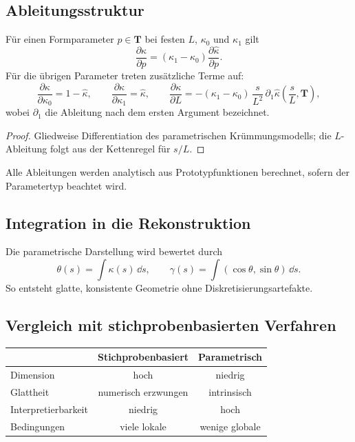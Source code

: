 \subsection{Ableitungsstruktur}
\begin{proposition}[Ableitungsstruktur]
\label{prop:parametric-derivative-structure}
Für einen Formparameter \(p\in\mathbf T\) bei festen \(L\), \(\kappa_0\)
und \(\kappa_1\) gilt
\[
\frac{\partial\kappa}{\partial p}
=(\kappa_1-\kappa_0)\frac{\partial\widehat\kappa}{\partial p}.
\]
Für die übrigen Parameter treten zusätzliche Terme auf:
\[
\frac{\partial\kappa}{\partial\kappa_0}=1-\widehat\kappa,
\qquad
\frac{\partial\kappa}{\partial\kappa_1}=\widehat\kappa,
\qquad
\frac{\partial\kappa}{\partial L}
=-(\kappa_1-\kappa_0)\,\frac{s}{L^2}\,
\partial_1\widehat\kappa\!\left(\frac{s}{L},\mathbf T\right),
\]
wobei \(\partial_1\) die Ableitung nach dem ersten Argument bezeichnet.
\end{proposition}
\begin{proof}
Gliedweise Differentiation des parametrischen Krümmungsmodells; die
\(L\)-Ableitung folgt aus der Kettenregel für \(s/L\).
\end{proof}
Alle Ableitungen werden analytisch aus Prototypfunktionen berechnet, sofern
der Parametertyp beachtet wird.

\subsection{Integration in die Rekonstruktion}
Die parametrische Darstellung wird bewertet durch
\[
\theta(s)=\int\kappa(s)\,\dd s,
\qquad\gamma(s)=\int(\cos\theta,\sin\theta)\,\dd s.
\]
So entsteht glatte, konsistente Geometrie ohne Diskretisierungsartefakte.

\subsection{Vergleich mit stichprobenbasierten Verfahren}
\begin{center}
\begin{tabular}{lcc}\toprule
& Stichprobenbasiert & Parametrisch\\\midrule
Dimension & hoch & niedrig\\
Glattheit & numerisch erzwungen & intrinsisch\\
Interpretierbarkeit & niedrig & hoch\\
Bedingungen & viele lokale & wenige globale\\\bottomrule
\end{tabular}
\end{center}

